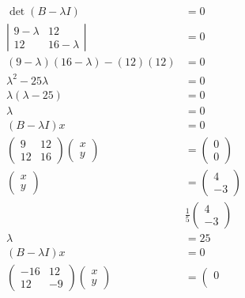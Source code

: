 \documentclass[main.tex]{subfiles}
\begin{document}
\begin{enumerate}
    $$
    \begin{aligned}
    \operatorname{det}(B-\lambda I) &=0 \\
    \left|\begin{array}{cc}
    9-\lambda & 12 \\
    12 & 16-\lambda
    \end{array}\right| &=0 \\
    (9-\lambda)(16-\lambda)-(12)(12) &=0 \\
    \lambda^{2}-25 \lambda &=0 \\
    \lambda(\lambda-25)&=0\\
    \lambda &= 0\\
    (B-\lambda I) x &=0\\
    \left(\begin{array}{ll}
    9 & 12 \\
    12 & 16
    \end{array}\right)\left(\begin{array}{l}
    x \\
    y
    \end{array}\right) &=\left(\begin{array}{l}
    0 \\
    0
    \end{array}\right) \\
    \left(\begin{array}{l}
    x \\
    y
    \end{array}\right) &=\left(\begin{array}{l}
    4 \\
    -3
    \end{array}\right)\\
    & \frac{1}{5}\left(\begin{array}{c}
    4 \\
    -3
    \end{array}\right)\\
    \lambda &= 25\\
    (B-\lambda I) x&=0\\
    \left(\begin{array}{cc}
    -16 & 12 \\
    12 & -9
    \end{array}\right)\left(\begin{array}{l}
    x \\
    y
    \end{array}\right) &=\left(\begin{array}{l}
    0 \\

\end{array}
\end{aligned}$$
\end{enumerate}
\end{document}
